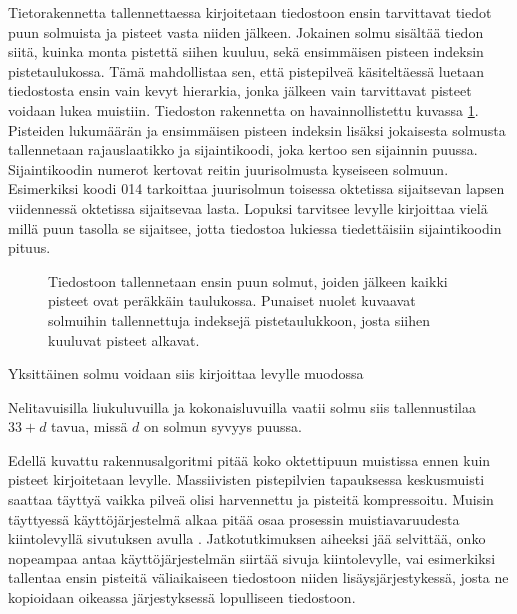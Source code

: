 Tietorakennetta tallennettaessa kirjoitetaan tiedostoon ensin tarvittavat tiedot puun solmuista ja pisteet vasta niiden jälkeen. Jokainen solmu sisältää tiedon siitä, kuinka monta pistettä siihen kuuluu, sekä ensimmäisen pisteen indeksin pistetaulukossa. Tämä mahdollistaa sen, että pistepilveä käsiteltäessä luetaan tiedostosta ensin vain kevyt hierarkia, jonka jälkeen vain tarvittavat pisteet voidaan lukea muistiin. Tiedoston rakennetta on havainnollistettu kuvassa \ref{layout}. Pisteiden lukumäärän ja ensimmäisen pisteen indeksin lisäksi jokaisesta solmusta tallennetaan rajauslaatikko ja sijaintikoodi, joka kertoo sen sijainnin puussa. Sijaintikoodin  numerot kertovat reitin juurisolmusta kyseiseen solmuun. Esimerkiksi koodi 014 tarkoittaa juurisolmun toisessa oktetissa sijaitsevan lapsen viidennessä oktetissa sijaitsevaa lasta. Lopuksi tarvitsee levylle kirjoittaa vielä millä puun tasolla se sijaitsee, jotta tiedostoa lukiessa tiedettäisiin sijaintikoodin pituus.

\begin{figure}
    \centering
    
    \caption{Tiedostoon tallennetaan ensin puun solmut, joiden jälkeen kaikki pisteet ovat peräkkäin taulukossa. Punaiset nuolet kuvaavat solmuihin tallennettuja indeksejä pistetaulukkoon, josta siihen kuuluvat pisteet alkavat.}
    \label{layout}
\end{figure}

Yksittäinen solmu voidaan siis kirjoittaa levylle muodossa 


\noindent Nelitavuisilla liukuluvuilla ja kokonaisluvuilla vaatii solmu siis tallennustilaa $33 + d$ tavua, missä $d$ on solmun syvyys puussa.

Edellä kuvattu rakennusalgoritmi pitää koko oktettipuun muistissa ennen kuin pisteet kirjoitetaan levylle. Massiivisten pistepilvien tapauksessa keskusmuisti saattaa täyttyä vaikka pilveä olisi harvennettu ja pisteitä kompressoitu. Muisin täyttyessä käyttöjärjestelmä alkaa pitää osaa prosessin muistiavaruudesta kiintolevyllä sivutuksen  avulla \cite{os}. Jatkotutkimuksen aiheeksi jää selvittää, onko nopeampaa antaa käyttöjärjestelmän siirtää sivuja kiintolevylle, vai esimerkiksi tallentaa ensin pisteitä väliaikaiseen tiedostoon niiden lisäysjärjestykessä, josta ne kopioidaan oikeassa järjestyksessä lopulliseen tiedostoon. 

